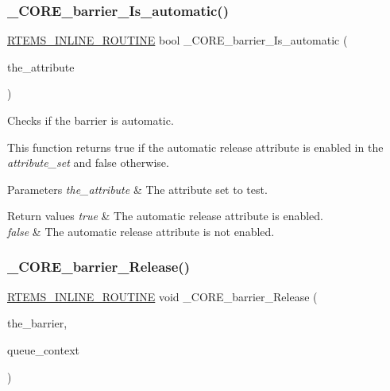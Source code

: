 \subsubsection{\texorpdfstring{\_CORE\_barrier\_Is\_automatic()}{\_CORE\_barrier\_Is\_automatic()}}
{\footnotesize\ttfamily \mbox{\hyperlink{group__RTEMSScoreBaseDefs_gac216239df231d5dbd15e3520b0b9313f}{R\+T\+E\+M\+S\+\_\+\+I\+N\+L\+I\+N\+E\+\_\+\+R\+O\+U\+T\+I\+NE}} bool \+\_\+\+C\+O\+R\+E\+\_\+barrier\+\_\+\+Is\+\_\+automatic (\begin{DoxyParamCaption}\item[{\mbox{\hyperlink{structCORE__barrier__Attributes}{C\+O\+R\+E\+\_\+barrier\+\_\+\+Attributes}} $\ast$}]{the\+\_\+attribute }\end{DoxyParamCaption})}



Checks if the barrier is automatic. 

This function returns true if the automatic release attribute is enabled in the {\itshape attribute\+\_\+set} and false otherwise.


\begin{DoxyParams}{Parameters}
{\em the\+\_\+attribute} & The attribute set to test.\\
\hline
\end{DoxyParams}

\begin{DoxyRetVals}{Return values}
{\em true} & The automatic release attribute is enabled. \\
\hline
{\em false} & The automatic release attribute is not enabled. \\
\hline
\end{DoxyRetVals}
\mbox{\label{group__RTEMSScoreBarrier_ga7de90fb9af1cf1c3e625fcab7d25e4af}} 
\subsubsection{\texorpdfstring{\_CORE\_barrier\_Release()}{\_CORE\_barrier\_Release()}}
{\footnotesize\ttfamily \mbox{\hyperlink{group__RTEMSScoreBaseDefs_gac216239df231d5dbd15e3520b0b9313f}{R\+T\+E\+M\+S\+\_\+\+I\+N\+L\+I\+N\+E\+\_\+\+R\+O\+U\+T\+I\+NE}} void \+\_\+\+C\+O\+R\+E\+\_\+barrier\+\_\+\+Release (\begin{DoxyParamCaption}\item[{\mbox{\hyperlink{structCORE__barrier__Control}{C\+O\+R\+E\+\_\+barrier\+\_\+\+Control}} $\ast$}]{the\+\_\+barrier,  }\item[{\mbox{\hyperlink{structThread__queue__Context}{Thread\+\_\+queue\+\_\+\+Context}} $\ast$}]{queue\+\_\+context }\end{DoxyParamCaption})}



